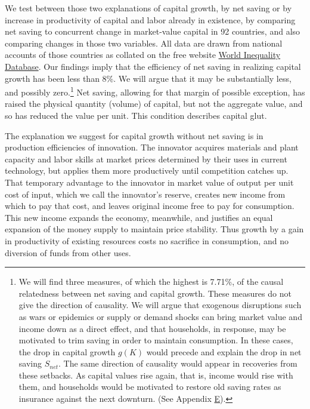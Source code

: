 \documentclass[a4padisinvitingper,fleqn]{latex_styles/cas-sc}
\begin{document}
We test between those two explanations of capital growth, by net
saving or by increase in productivity of capital and labor already
in existence, by comparing net saving to concurrent change in
market-value capital in 92 countries, 
and also comparing changes in those two variables.
All data are drawn from national accounts
of those countries as collated on the free website \href{https://wid.world/}{World Inequality Database}. Our findings 
imply that the efficiency of net saving in realizing capital growth has been less than 8\%. We will argue that it may be substantially less, and possibly zero.\footnote{We will find three measures, of which the highest is 7.71\%, of the causal relatedness between net saving and capital growth. These measures do not give the direction of causality. We will argue that exogenous 
%
    disruptions such as wars or epidemics or supply or demand shocks can bring market value and income down as a direct effect, and that households, in response, may be motivated to trim saving in order to maintain consumption. In these cases, the drop in capital growth \(g(K)\) would precede and explain the drop in net saving \(S_{net}\). The same direction of causality would appear in recoveries from these setbacks. As capital values rise again, that is, income would rise with them, and households would be motivated to restore old saving rates as insurance against the next downturn. (See Appendix \hyperref[appendix-e]{E}).
%
} Net saving, allowing for that margin of possible exception, has raised the physical quantity (volume) of capital, but not the
aggregate value, and so has reduced the value per unit.
This condition describes capital glut.

The explanation we suggest for capital growth without net saving is in production efficiencies of innovation. 
The innovator acquires materials and plant capacity and labor skills at market prices
determined by their uses in current technology, but applies them more
productively until competition catches up. That temporary
advantage to the innovator in market value of output per unit cost of input, which we call the innovator's reserve, creates new income from which to pay that cost, and leaves original income free to pay for consumption. This new income expands the economy, meanwhile, and justifies an equal expansion of the money supply to maintain price stability. Thus growth by a gain in productivity of existing resources costs no sacrifice in consumption, and no diversion of funds from other uses.
\end{document}
